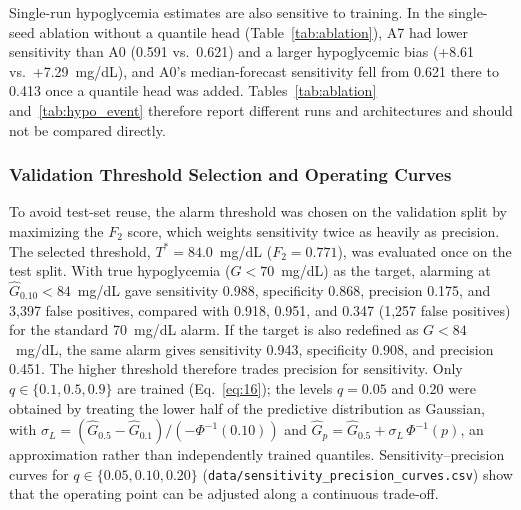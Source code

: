 \documentclass[journal]{IEEEtran}
\begin{document}
Single-run hypoglycemia estimates are also sensitive to training. In the single-seed ablation without a quantile head (Table~\ref{tab:ablation}), A7 had lower sensitivity than A0 (0.591 vs.\ 0.621) and a larger hypoglycemic bias (+8.61 vs.\ +7.29~mg/dL), and A0's median-forecast sensitivity fell from 0.621 there to 0.413 once a quantile head was added. Tables~\ref{tab:ablation} and~\ref{tab:hypo_event} therefore report different runs and architectures and should not be compared directly.

\subsubsection{Validation Threshold Selection and Operating Curves}
\label{sec:validation_threshold_selection}
To avoid test-set reuse, the alarm threshold was chosen on the validation split by maximizing the $F_2$ score, which weights sensitivity twice as heavily as precision. The selected threshold, $T^* = 84.0$~mg/dL ($F_2 = 0.771$), was evaluated once on the test split. With true hypoglycemia ($G < 70$~mg/dL) as the target, alarming at $\hat{G}_{0.10} < 84$~mg/dL gave sensitivity 0.988, specificity 0.868, precision 0.175, and 3,397 false positives, compared with 0.918, 0.951, and 0.347 (1,257 false positives) for the standard 70~mg/dL alarm. If the target is also redefined as $G < 84$~mg/dL, the same alarm gives sensitivity 0.943, specificity 0.908, and precision 0.451. The higher threshold therefore trades precision for sensitivity. Only $q \in \{0.1, 0.5, 0.9\}$ are trained (Eq.~\eqref{eq:16}); the levels $q = 0.05$ and $0.20$ were obtained by treating the lower half of the predictive distribution as Gaussian, with $\sigma_L = (\hat{G}_{0.5} - \hat{G}_{0.1})/(-\Phi^{-1}(0.10))$ and $\hat{G}_p = \hat{G}_{0.5} + \sigma_L\,\Phi^{-1}(p)$, an approximation rather than independently trained quantiles. Sensitivity--precision curves for $q \in \{0.05, 0.10, 0.20\}$ (\texttt{data/sensitivity\_precision\_curves.csv}) show that the operating point can be adjusted along a continuous trade-off.
\end{document}
